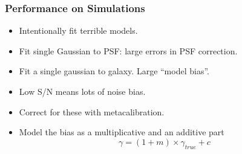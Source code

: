 \documentclass{beamer}
\newcommand{\mcal}{metacalibration}
\begin{document}
\frame
{
    \frametitle{Performance on Simulations}

 
    \begin{itemize}
        \item Intentionally fit terrible models.

        \item Fit single Gaussian to PSF: large errors in
            PSF correction.

        \item Fit a single gaussian to galaxy. Large ``model bias''.
            
        \item Low S/N means lots of noise bias.

        \item Correct for these with \mcal.

        \item Model the bias as a multiplicative and an additive part
            {\color{lightskyblue} 
                \begin{equation}
                    \gamma = (1 + m ) \times \gamma_{true} + c \nonumber
                \end{equation}
            }

    \end{itemize}
}
\end{document}
